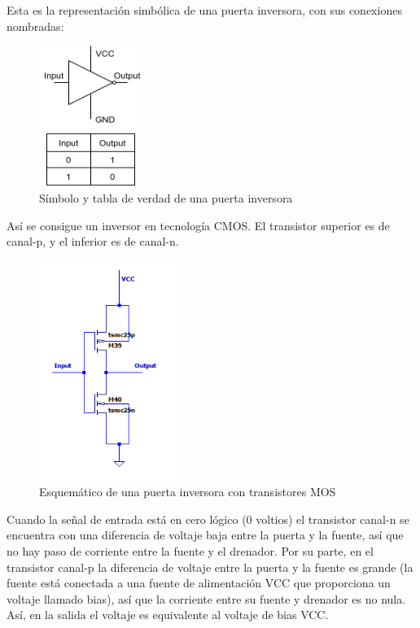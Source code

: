 \documentclass[12pt]{report} %
\begin{document}
	Esta es la representación simbólica de una puerta inversora, con sus conexiones nombradas:
	\begin{figure}[H]
		\includegraphics[width=0.3\textwidth]{inverter-symbol.png}
		\caption[Símbolo y tabla de verdad de una puerta inversora]{Símbolo y tabla de verdad de una puerta inversora}
		\label{fig:inverter-symbol.png}
	\end{figure}
	
	Así se consigue un inversor en tecnología CMOS. El transistor superior es de canal-p, y el inferior es de canal-n.
	\begin{figure}[H]
		\includegraphics[width=0.4\textwidth]{inverter-sch.png}
		\caption[Esquemático de una puerta inversora con transistores MOS]{Esquemático de una puerta inversora con transistores MOS}
		\label{fig:inverter-sch.png}
	\end{figure}
	
	Cuando la señal de entrada está en cero lógico (0 voltios) el transistor canal-n se encuentra con una diferencia de voltaje baja entre la puerta y la fuente, así que no hay paso de corriente entre la fuente y el drenador. Por su parte, en el transistor canal-p la diferencia de voltaje entre la puerta y la fuente es grande (la fuente está conectada a una fuente de alimentación VCC que proporciona un voltaje llamado bias), así que la corriente entre su fuente y drenador es no nula. Así, en la salida el voltaje es equivalente al voltaje de bias VCC.
	
\end{document}
